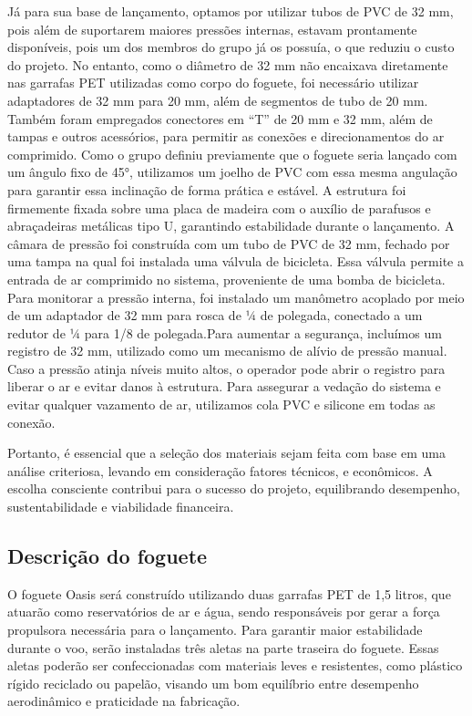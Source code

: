 Já para sua base de lançamento, optamos por utilizar tubos de PVC de 32 mm, pois além de suportarem maiores pressões internas, estavam prontamente disponíveis, pois um dos membros do grupo já os possuía, o que reduziu o custo do projeto. No entanto, como o diâmetro de 32 mm não encaixava diretamente nas garrafas PET utilizadas como corpo do foguete, foi necessário utilizar adaptadores de 32 mm para 20 mm, além de segmentos de tubo de 20 mm. Também foram empregados conectores em “T” de 20 mm e 32 mm, além de tampas e outros acessórios, para permitir as conexões e direcionamentos do ar comprimido. Como o grupo definiu previamente que o foguete seria lançado com um ângulo fixo de 45°, utilizamos um joelho de PVC com essa mesma angulação para garantir essa inclinação de forma prática e estável. A estrutura foi firmemente fixada sobre uma placa de madeira com o auxílio de parafusos e abraçadeiras metálicas tipo U, garantindo estabilidade durante o lançamento. A câmara de pressão foi construída com um tubo de PVC de 32 mm, fechado por uma tampa na qual foi instalada uma válvula de bicicleta. Essa válvula permite a entrada de ar comprimido no sistema, proveniente de uma bomba de bicicleta. Para monitorar a pressão interna, foi instalado um manômetro acoplado por meio de um adaptador de 32 mm para rosca de ¼ de polegada, conectado a um redutor de ¼ para 1/8 de polegada.Para aumentar a segurança, incluímos um registro de 32 mm, utilizado como um mecanismo de alívio de pressão manual. Caso a pressão atinja níveis muito altos, o operador pode abrir o registro para liberar o ar e evitar danos à estrutura. Para assegurar a vedação do sistema e evitar qualquer vazamento de ar, utilizamos cola PVC e silicone em todas as conexão.

Portanto, é essencial que a seleção dos materiais sejam feita com base em uma análise criteriosa, levando em consideração fatores técnicos, e econômicos. A escolha consciente contribui para o sucesso do projeto, equilibrando desempenho, sustentabilidade e viabilidade financeira.



\subsection{Descrição do foguete}
O foguete Oasis será construído utilizando duas garrafas PET de 1,5 litros, que atuarão como reservatórios de ar e água, sendo responsáveis por gerar a força propulsora necessária para o lançamento. Para garantir maior estabilidade durante o voo, serão instaladas três aletas na parte traseira do foguete. Essas aletas poderão ser confeccionadas com materiais leves e resistentes, como plástico rígido reciclado ou papelão, visando um bom equilíbrio entre desempenho aerodinâmico e praticidade na fabricação.

